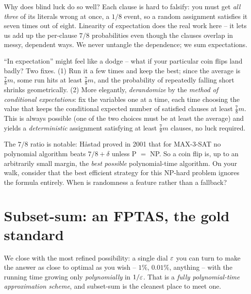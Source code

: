 \begin{intuitionbox}
Why does blind luck do so well? Each clause is hard to falsify: you must get
\emph{all three} of its literals wrong at once, a $1/8$ event, so a random
assignment satisfies it seven times out of eight. Linearity of
expectation does the real work here -- it lets us add up the per-clause $7/8$
probabilities even though the clauses overlap in messy, dependent ways. We
never untangle the dependence; we sum expectations.
\end{intuitionbox}

\begin{remark}
``In expectation'' might feel like a dodge -- what if your particular coin
flips land badly? Two fixes. (1) Run it a few times and keep the best; since
the average is $\tfrac78 m$, some run hits at least $\tfrac78 m$, and the
probability of repeatedly falling short shrinks geometrically. (2) More
elegantly, \emph{derandomize} by the \emph{method of conditional
expectations}: fix the variables one at a time, each time choosing the value
that keeps the conditional expected number of satisfied clauses at least
$\tfrac78 m$. This is always possible (one of the two choices must be at least
the average) and yields a \emph{deterministic} assignment satisfying at least
$\tfrac78 m$ clauses, no luck required.
\end{remark}

\begin{walkbox}
The $7/8$ ratio is notable: H\aa stad proved in 2001 that for MAX-3-SAT no
polynomial algorithm beats $7/8 + \delta$ unless P $=$ NP. So a coin
flip is, up to an arbitrarily small margin, the \emph{best possible} polynomial-time
algorithm. On your walk, consider that the best efficient strategy for this
NP-hard problem ignores the formula entirely. When is randomness a feature rather than a fallback?
\end{walkbox}

\section{Subset-sum: an FPTAS, the gold standard}

We close with the most refined possibility: a single dial $\varepsilon$ you can turn
to make the answer as close to optimal as you wish -- $1\%$, $0.01\%$,
anything -- with the running time growing only \emph{polynomially} in
$1/\varepsilon$. That is a \emph{fully polynomial-time approximation scheme}, and
subset-sum is the cleanest place to meet one.

